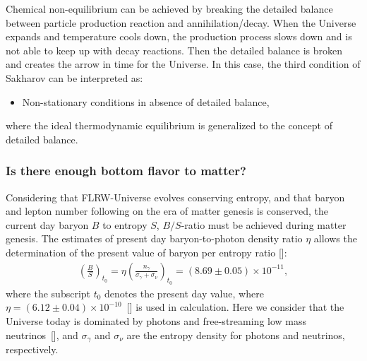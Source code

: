 Chemical non-equilibrium can be achieved by breaking the detailed balance between particle production reaction and annihilation/decay. 
When the Universe expands and temperature cools down, the production process slows down and is not able to keep up with decay reactions. Then the detailed balance is broken and creates the arrow in time for the Universe. In this case, the third condition of Sakharov can be interpreted as:
\begin{itemize}
  \item Non-stationary conditions in absence of detailed balance,
\end{itemize}
where the ideal thermodynamic equilibrium is generalized to the concept of detailed balance.  





 \subsubsection{Is there enough bottom flavor to matter?} Considering that FLRW-Universe evolves conserving entropy, and that baryon and lepton number following on the era of matter genesis is conserved, the current day baryon $B$ to entropy $S$, $B/S$-ratio must be achieved during matter genesis. The estimates of present day baryon-to-photon density ratio $\eta$ allows the determination of the present value of baryon per entropy ratio [\cite{Rafelski:2019twp,Letessier:2002ony,Fromerth:2002wb,Fromerth:2012fe}]:
\begin{align}
\left(\frac{B}{S}\right)_{t_0}\!\!\!\!=\eta\left(\frac{n_\gamma}{\sigma_\gamma+\sigma_\nu}\right)_{\!t_0}\!\!\!\!=(8.69\pm0.05)\!\!\times\!\!10^{-11},
\end{align}
where the subscript $t_0$ denotes the present day value, where $\eta=(6.12\pm0.04)\times10^{-10}$~[\cite{ParticleDataGroup:2018ovx}] is used in calculation. Here we consider that the Universe today is dominated by photons and free-streaming low mass neutrinos~[\cite{Birrell:2012gg}], and $\sigma_\gamma$ and $\sigma_\nu$ are the entropy density for photons and neutrinos, respectively. 
 
